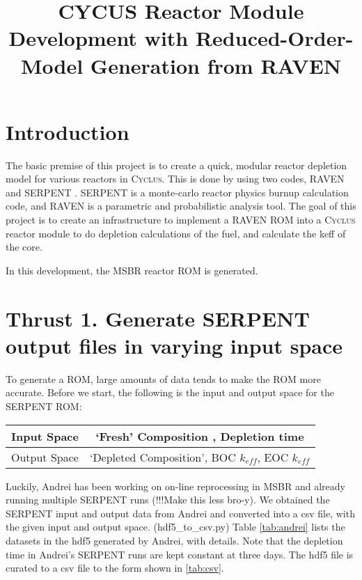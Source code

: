 \documentclass{article}
\newcommand{\Cyclus}{\textsc{Cyclus}\xspace}%
\begin{document}
\title{CYCUS Reactor Module Development with Reduced-Order-Model Generation from RAVEN}

\date{}                     %



\section{Introduction}

The basic premise of this project is to create a quick, modular
reactor depletion model for various reactors in \Cyclus. This is done
by using two codes, RAVEN \cite{alfonsi_raven_2013} and SERPENT \cite{leppanen_serpent-a_2013} . SERPENT is a monte-carlo
reactor physics burnup calculation code, and RAVEN is a parametric
and probabilistic analysis tool. The goal of this project is to 
create an infrastructure to implement a RAVEN \gls{ROM} into a \Cyclus
reactor module to do depletion calculations of the fuel, and calculate
the keff of the core. 

In this development, the \gls{MSBR} \cite{robertson_conceptual_1971}
reactor \gls{ROM} is generated.

\section*{Thrust 1. Generate SERPENT output files in varying input space}
To generate a \gls{ROM}, large amounts of data tends to make the
\gls{ROM} more accurate. Before we start, the following is the input and 
output space for the SERPENT \gls{ROM}:

\begin{center}
\begin{tabular}{ c c }
    \hline
    Input Space & `Fresh' Composition , Depletion time \\
    \hline
    Output Space & `Depleted Composition', BOC $k_{eff}$, EOC $k_{eff}$ \\
    \hline
\end{tabular}
\end{center} 

Luckily, Andrei has been working on on-line reprocessing in \gls{MSBR}
and already running multiple SERPENT runs (!!!Make this less bro-y).
We obtained the SERPENT input and output data from Andrei and converted
into a csv file, with the given input and output space. (hdf5\_to\_csv.py)
Table \ref{tab:andrei} lists the datasets in the hdf5 generated by Andrei,
with details. Note that the depletion time in Andrei's SERPENT runs are
kept constant at three days. The hdf5 file is curated to a csv file to
the form shown in \ref{tab:csv}.
\FloatBarrier
\end{document}
